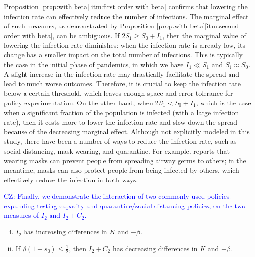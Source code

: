 \documentclass[nonblindrev, copyedit]{informs3a}
\newcommand\cz[1]{\textcolor{blue}{CZ: #1}}
\newcounter{prop}[chapter]
\begin{document}
Proposition \ref{prop:with beta}\eqref{itm:first order with beta} confirms that lowering the infection rate can effectively reduce the number of infections.
The marginal effect of such measures, as demonstrated by Proposition \ref{prop:with beta}\eqref{itm:second order with beta}, can be ambiguous.
If $2S_1\ge S_0+I_1$, then the marginal value of lowering the infection rate diminishes: when the infection rate is already low, its change has a smaller impact on the total number of infections.
This is typically the case in the initial phase of pandemics, in which we have $I_1\ll S_1$ and $S_1\approx S_0$.
A slight increase in the infection rate may drastically facilitate the spread and lead to much worse outcomes.
Therefore, it is crucial to keep the infection rate below a certain threshold, which leaves enough space and error tolerance for policy experimentation.
On the other hand, when $2S_1< S_0+I_1$, which is the case when a significant fraction of the population is infected (with a large infection rate), then it costs more to lower the infection rate and slow down the spread because of the decreasing marginal effect.
Although not explicitly modeled in this study, there have been a number of ways to reduce the infection rate, such as social distancing, mask-wearing, and quarantine.
For example, \citet{wu2020masks} reports that wearing masks can prevent people from spreading airway germs to others; in the meantime, masks can also protect people from being infected by others, which effectively reduce the infection in both ways.

\cz{Finally, we demonstrate the interaction of two commonly used policies, expanding testing capacity and quarantine/social distancing policies, on the two measures of $I_2$ and $I_2+C_2$.}

\begin{proposition}
\label{prop:two policies}
    \begin{enumerate}[(i)]
    \item\label{itm:with i2}
    $I_2$ has increasing differences in $K$ and $-\beta$. 
    \item\label{itm:with i2c2} 
    If $\beta(1-s_0)\leq\frac{1}{2}$, then $I_2+C_2$ has decreasing differences in $K$ and $-\beta$. 
   \end{enumerate}
\end{proposition}
\end{document}
